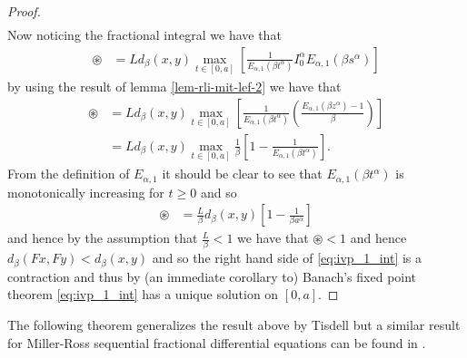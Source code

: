 \begin{proof}
\begin{align*}
	\end{align*}
	Now noticing the fractional integral we have that
	\begin{align*}
		\circledast &= L d_\beta(x,y) \max_{t\in [0,a]} \left[ \frac{1}{E_{\alpha,1}(\beta t^\alpha)} I^\alpha_0 E_{\alpha,1}(\beta s^\alpha) \right]
	\end{align*}
	by using the result of lemma \ref{lem-rli-mit-lef-2} we have that
	\begin{align*}
		\circledast &= L d_\beta(x,y) \max_{t\in [0,a]} \left[ \frac{1}{E_{\alpha,1}(\beta t^\alpha)} \left( \frac{E_{\alpha,1}(\beta z^\alpha) - 1}{\beta} \right) \right] \\
			&= L d_\beta(x,y) \max_{t\in [0,a]} \frac{1}{\beta}\left[ 1 - \frac{1}{E_{\alpha, 1}(\beta t^\alpha)} \right].
	\end{align*}
	From the definition of $ E_{\alpha,1} $ it should be clear to see that $ E_{\alpha, 1}(\beta t^\alpha) $ is monotonically increasing for $ t \geq 0 $ and so
	\begin{align*}
		\circledast &= \frac{L}{\beta} d_\beta (x,y)\left[ 1- \frac{1}{\beta a^\alpha} \right]
	\end{align*}
	and hence by the assumption that $ \frac{L}{\beta} < 1 $ we have that $ \circledast < 1 $ and hence $ d_\beta(Fx, Fy) < d_\beta(x,y) $ and so the right hand side of \eqref{eq:ivp_1_int} is a contraction and thus by (an immediate corollary to) Banach's fixed point theorem \eqref{eq:ivp_1_int} has a unique solution on $ [0,a] $.
\end{proof}



The following theorem generalizes the result above by Tisdell \cite{Tisdell2012} but a similar result for Miller-Ross sequential
fractional differential equations can be found in \cite{Podlubny1999}.

